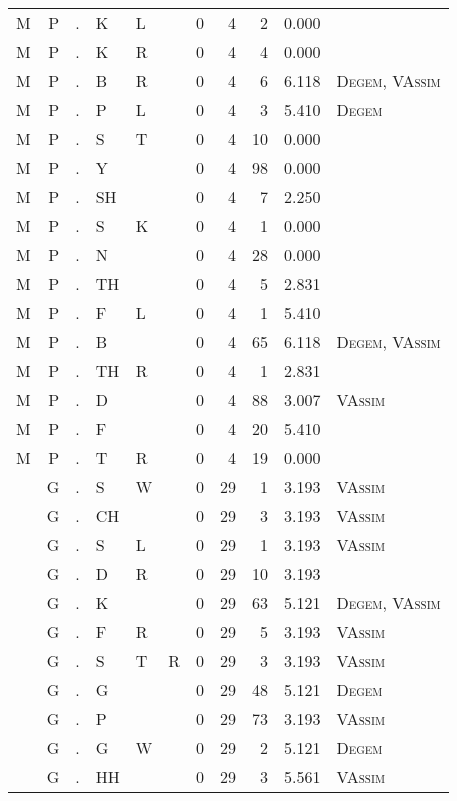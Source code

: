 \begin{longtable}{r@{ } r@{ } c@{ } l@{ } l@{ } l@{ } r r r r l }
M & P & . & K & L &  & 0 & 4 & 2 & 0.000 &  \\
M & P & . & K & R &  & 0 & 4 & 4 & 0.000 &  \\
M & P & . & B & R &  & 0 & 4 & 6 & 6.118 & \textsc{Degem}, \textsc{VAssim} \\
M & P & . & P & L &  & 0 & 4 & 3 & 5.410 & \textsc{Degem} \\
M & P & . & S & T &  & 0 & 4 & 10 & 0.000 &  \\
M & P & . & Y &  &  & 0 & 4 & 98 & 0.000 &  \\
M & P & . & SH &  &  & 0 & 4 & 7 & 2.250 &  \\
M & P & . & S & K &  & 0 & 4 & 1 & 0.000 &  \\
M & P & . & N &  &  & 0 & 4 & 28 & 0.000 &  \\
M & P & . & TH &  &  & 0 & 4 & 5 & 2.831 &  \\
M & P & . & F & L &  & 0 & 4 & 1 & 5.410 &  \\
M & P & . & B &  &  & 0 & 4 & 65 & 6.118 & \textsc{Degem}, \textsc{VAssim} \\
M & P & . & TH & R &  & 0 & 4 & 1 & 2.831 &  \\
M & P & . & D &  &  & 0 & 4 & 88 & 3.007 & \textsc{VAssim} \\
M & P & . & F &  &  & 0 & 4 & 20 & 5.410 &  \\
M & P & . & T & R &  & 0 & 4 & 19 & 0.000 &  \\
 & G & . & S & W &  & 0 & 29 & 1 & 3.193 & \textsc{VAssim} \\
 & G & . & CH &  &  & 0 & 29 & 3 & 3.193 & \textsc{VAssim} \\
 & G & . & S & L &  & 0 & 29 & 1 & 3.193 & \textsc{VAssim} \\
 & G & . & D & R &  & 0 & 29 & 10 & 3.193 &  \\
 & G & . & K &  &  & 0 & 29 & 63 & 5.121 & \textsc{Degem}, \textsc{VAssim} \\
 & G & . & F & R &  & 0 & 29 & 5 & 3.193 & \textsc{VAssim} \\
 & G & . & S & T & R & 0 & 29 & 3 & 3.193 & \textsc{VAssim} \\
 & G & . & G &  &  & 0 & 29 & 48 & 5.121 & \textsc{Degem} \\
 & G & . & P &  &  & 0 & 29 & 73 & 3.193 & \textsc{VAssim} \\
 & G & . & G & W &  & 0 & 29 & 2 & 5.121 & \textsc{Degem} \\
 & G & . & HH &  &  & 0 & 29 & 3 & 5.561 & \textsc{VAssim} \\

\end{longtable}
